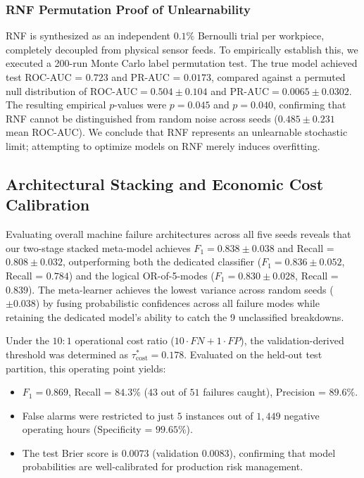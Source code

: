 \documentclass[conference]{IEEEtran}
\begin{document}
\subsubsection{RNF Permutation Proof of Unlearnability}
RNF is synthesized as an independent $0.1\%$ Bernoulli trial per workpiece, completely decoupled from physical sensor feeds. To empirically establish this, we executed a 200-run Monte Carlo label permutation test. The true model achieved test ROC-AUC = $0.723$ and PR-AUC = $0.0173$, compared against a permuted null distribution of $\text{ROC-AUC} = 0.504 \pm 0.104$ and $\text{PR-AUC} = 0.0065 \pm 0.0302$. The resulting empirical $p$-values were $p = 0.045$ and $p = 0.040$, confirming that RNF cannot be distinguished from random noise across seeds ($0.485 \pm 0.231$ mean ROC-AUC). We conclude that RNF represents an unlearnable stochastic limit; attempting to optimize models on RNF merely induces overfitting.

\subsection{Architectural Stacking and Economic Cost Calibration}
Evaluating overall machine failure architectures across all five seeds reveals that our two-stage stacked meta-model achieves $F_1 = 0.838 \pm 0.038$ and Recall = $0.808 \pm 0.032$, outperforming both the dedicated classifier ($F_1 = 0.836 \pm 0.052$, Recall = $0.784$) and the logical OR-of-5-modes ($F_1 = 0.830 \pm 0.028$, Recall = $0.839$). The meta-learner achieves the lowest variance across random seeds ($\pm 0.038$) by fusing probabilistic confidences across all failure modes while retaining the dedicated model's ability to catch the 9 unclassified breakdowns.

Under the $10:1$ operational cost ratio ($10 \cdot FN + 1 \cdot FP$), the validation-derived threshold was determined as $\tau_{\text{cost}}^* = 0.178$. Evaluated on the held-out test partition, this operating point yields:
\begin{itemize}
    \item $F_1 = 0.869$, Recall = $\mathbf{84.3\%}$ ($43$ out of $51$ failures caught), Precision = $\mathbf{89.6\%}$.
    \item False alarms were restricted to just $5$ instances out of $1,449$ negative operating hours (Specificity = $99.65\%$).
    \item The test Brier score is $\mathbf{0.0073}$ (validation $0.0083$), confirming that model probabilities are well-calibrated for production risk management.
\end{itemize}
\end{document}
